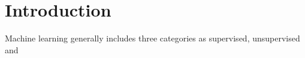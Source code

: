 \section{Introduction}

Machine learning generally includes three categories as supervised, unsupervised and 
